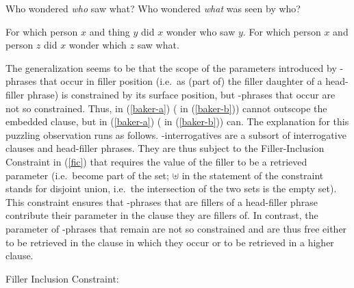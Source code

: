 \documentclass[output=paper
 	        ,biblatex
                ,babelshorthands
                ,newtxmath
                ,draftmode
                ,colorlinks, citecolor=brown
]{langscibook}
\begin{document}
\begin{exe}
\ex\label{baker-exs}
\begin{xlist}
\ex\label{baker-a} Who wondered \emph{who} saw what?
\ex\label{baker-b} Who wondered \emph{what} was seen by who?
\end{xlist}
\ex\label{baker-sem}
\begin{xlist}
\ex\label{baker-sem-a}For which person $x$ and thing $y$ did $x$ wonder who saw $y$.
\ex\label{baker-sem-b}For which person $x$ and person $z$ did $x$ wonder which $z$ saw what.
\end{xlist}
\end{exe}

The generalization seems to be that the scope of the parameters  introduced by -phrases that occur in filler position (i.e.\ as (part of) the filler daughter of a head-filler phrase) is constrained by its surface position, but -phrases that occur  are not so constrained. Thus,  in (\ref{baker-a})  ( in (\ref{baker-b})) cannot outscope the embedded clause, but  in (\ref{baker-a}) ( in (\ref{baker-b})) can.
The explanation for this puzzling observation runs as follows. -interrogatives are a subsort of interrogative clauses and head-filler phrases. They are thus subject to the Filler-Inclusion Constraint in (\ref{fic}) that requires the  value of the filler to be a retrieved parameter (i.e.\ become part of the  set; $\uplus$ in the statement of the constraint stands for disjoint union, i.e.\ the intersection of the two sets is the empty set). 
This constraint ensures that -phrases that are fillers of a head-filler phrase contribute their parameter in the clause they are fillers of. In contrast, the parameter of -phrases that remain  are not so constrained and are thus free either to be retrieved in the clause in which they occur or to be retrieved in a higher clause. 

\begin{exe}
\ex\label{fic}Filler Inclusion Constraint:\\

\end{exe}
\end{document}
